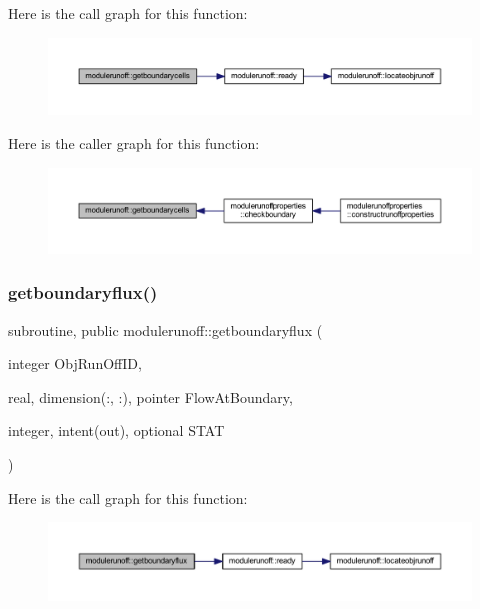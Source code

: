 Here is the call graph for this function\+:
\nopagebreak
\begin{figure}[H]
\begin{center}
\leavevmode
\includegraphics[width=350pt]{namespacemodulerunoff_a94d1c021f061e9cfa1f07c3845541525_cgraph}
\end{center}
\end{figure}
Here is the caller graph for this function\+:
\nopagebreak
\begin{figure}[H]
\begin{center}
\leavevmode
\includegraphics[width=350pt]{namespacemodulerunoff_a94d1c021f061e9cfa1f07c3845541525_icgraph}
\end{center}
\end{figure}
\mbox{\label{namespacemodulerunoff_aa5c3e304953e0e305461bb0ef472e0f8}} 
\subsubsection{\texorpdfstring{getboundaryflux()}{getboundaryflux()}}
{\footnotesize\ttfamily subroutine, public modulerunoff\+::getboundaryflux (\begin{DoxyParamCaption}\item[{integer}]{Obj\+Run\+Off\+ID,  }\item[{real, dimension(\+:, \+:), pointer}]{Flow\+At\+Boundary,  }\item[{integer, intent(out), optional}]{S\+T\+AT }\end{DoxyParamCaption})}

Here is the call graph for this function\+:
\nopagebreak
\begin{figure}[H]
\begin{center}
\leavevmode
\includegraphics[width=350pt]{namespacemodulerunoff_aa5c3e304953e0e305461bb0ef472e0f8_cgraph}
\end{center}
\end{figure}
\mbox{\label{namespacemodulerunoff_a721381be9f2b0f07b9349c1a1df63001}} 
